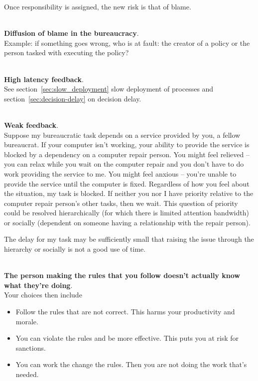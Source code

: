 Once responsibility is assigned, the new risk is that of blame.

\ \\

\textbf{Diffusion of blame in the bureaucracy}. \\
Example: if something goes wrong, who is at fault: the creator of a policy or the person tasked with executing the policy?

\ \\

\textbf{High latency feedback}. \\
See section~\ref{sec:slow_deployment} slow deployment of processes and section~\ref{sec:decision-delay} on decision delay.

\ \\

\textbf{Weak feedback}. \\
Suppose my bureaucratic task depends on a service provided by you, a fellow bureaucrat. If your computer isn't working, your ability to provide the service is blocked by a dependency on a computer repair person. You might feel relieved -- you can relax while you wait on the computer repair and you don't have to do work providing the service to me. You might feel anxious -- you're unable to provide the service until the computer is fixed. Regardless of how you feel about the situation, my task is blocked. If neither you nor I have priority relative to the computer repair person's other tasks, then we wait. This question of priority could be resolved hierarchically (for which there is limited attention bandwidth) or socially (dependent on someone having a relationship with the repair person). 

The delay for my task may be sufficiently small that raising the issue through the hierarchy or socially is not a good use of time.

\ \\

\textbf{The person making the rules that you follow doesn't actually know what they're doing}. \\
Your choices then include
\begin{itemize}
    \item Follow the rules that are not correct. This harms your productivity and morale. 
\item You can violate the rules and be more effective. This puts you at risk for sanctions. 
\item You can work the change the rules. Then you are not doing the work that's needed.
\end{itemize}


